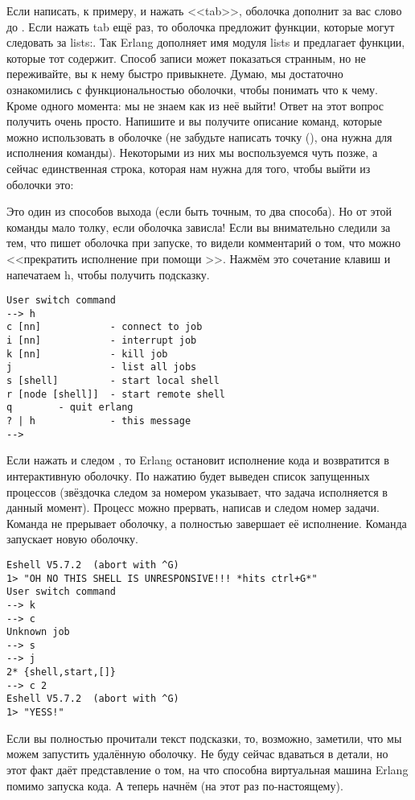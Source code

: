 Если написать, к примеру,  и нажать <<tab>>, оболочка дополнит за вас слово до . Если нажать tab ещё раз, то оболочка предложит функции, которые могут следовать за lists:. Так Erlang дополняет имя модуля lists и предлагает функции, которые тот содержит. Способ записи может показаться странным, но не переживайте, вы к нему быстро привыкнете.
Думаю, мы достаточно ознакомились с функциональностью оболочки, чтобы понимать что к чему. Кроме одного момента: мы не знаем как из неё выйти! Ответ на этот вопрос получить очень просто. Напишите  и вы получите описание команд, которые можно использовать в оболочке (не забудьте написать точку (), она нужна для исполнения команды). Некоторыми из них мы воспользуемся чуть позже, а сейчас единственная строка, которая нам нужна для того, чтобы выйти из оболочки это:\\ 

Это один из способов выхода (если быть точным, то два способа). Но от этой команды мало толку, если оболочка зависла! Если вы внимательно следили за тем, что пишет оболочка при запуске, то видели комментарий о том, что можно <<прекратить исполнение при помощи >>. Нажмём это сочетание клавиш и напечатаем h, чтобы получить подсказку.
\begin{lstlisting}[style=repl]
User switch command
--> h
c [nn]            - connect to job
i [nn]            - interrupt job
k [nn]            - kill job
j                 - list all jobs
s [shell]         - start local shell
r [node [shell]]  - start remote shell
q        - quit erlang
? | h             - this message
-->
\end{lstlisting}

Если нажать  и следом , то Erlang остановит исполнение кода и возвратится в интерактивную оболочку. По нажатию  будет выведен список запущенных процессов (звёздочка следом за номером указывает, что задача исполняется в данный момент). Процесс можно прервать, написав  и следом номер задачи. Команда  не прерывает оболочку, а полностью завершает её исполнение. Команда  запускает новую оболочку.
\begin{lstlisting}[style=repl]
Eshell V5.7.2  (abort with ^G)
1> "OH NO THIS SHELL IS UNRESPONSIVE!!! *hits ctrl+G*"
User switch command
--> k
--> c
Unknown job
--> s
--> j
2* {shell,start,[]}
--> c 2
Eshell V5.7.2  (abort with ^G)
1> "YESS!"
\end{lstlisting}

Если вы полностью прочитали текст подсказки, то, возможно, заметили, что мы можем запустить удалённую оболочку. Не буду сейчас вдаваться в детали, но этот факт даёт представление о том, на что способна виртуальная машина Erlang помимо запуска кода. А теперь начнём (на этот раз по\--настоящему).
